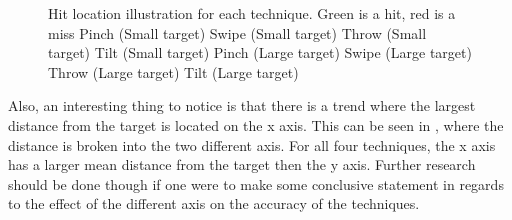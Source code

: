 \begin{figure}[H]
	\caption{
		Hit location illustration for each technique. Green is a hit, red is a miss
		\protect{} Pinch (Small target)
		\protect{} Swipe (Small target)
		\protect{} Throw (Small target)
		\protect{} Tilt (Small target)
		\protect{} Pinch (Large target)
		\protect{} Swipe (Large target)
		\protect{} Throw (Large target)
		\protect{} Tilt (Large target)
	}
	\label{fig:thitboxes}
\end{figure}


Also, an interesting thing to notice is that there is a trend where the largest distance from the target is located on the x axis. 
This can be seen in , where the distance is broken into the two different axis. 
For all four techniques, the x axis has a larger mean distance from the target then the y axis. 
Further research should be done though if one were to make some conclusive statement in regards to the effect of the different axis on the accuracy of the techniques. 

